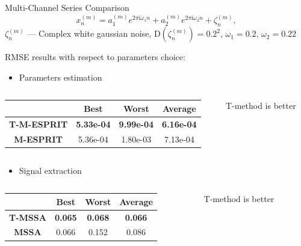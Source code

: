 \documentclass[pdf, unicode, ucs, notheorems]{beamer}
\newcommand{\bluetext}[1]{{\usebeamercolor[fg]{bluetext_color}#1}}
\theoremstyle{definition}
\begin{document}
\begin{frame}{Multi-Channel Series Comparison}
  \[
    x_{n}^{(m)} = a_1^{(m)}
    e^{2 \pi \mathrm{i} \omega_1 n} +
    a_2^{(m)}
    e^{2 \pi \mathrm{i} \omega_2 n} + \zeta_n^{(m)},
  \]
  $\zeta_n^{(m)}$ --- Complex white gaussian noise,
  $\mathrm{D}\left(\zeta_n^{(m)}\right) = 0.2^2$, $\omega_1 = 0.2,\,
  \omega_2 = 0.22$

  \medskip

  \bluetext{RMSE results with respect to parameters choice:}
  \begin{itemize}
    \item Parameters estimation
  \end{itemize}

  \begin{columns}
    \begin{column}{0.8\textwidth}
      \begin{table}[ht]
        \centering
        \begin{tabular}{c|ccc}
          \hline
          & Best & Worst & Average \\
          \hline
          \textbf{T-M-ESPRIT} & \textbf{\bluetext{5.33e-04}} &
          \textbf{\bluetext{9.99e-04}} &
          \textbf{\bluetext{6.16e-04}} \\
          \textbf{M-ESPRIT} & \bluetext{5.36e-04} & 1.80e-03
          & 7.13e-04 \\
          \hline
        \end{tabular}
      \end{table}
    \end{column}
    \begin{column}{0.2\textwidth}
      T-method is better
    \end{column}
  \end{columns}

  \begin{itemize}
    \item Signal extraction
  \end{itemize}

  \begin{columns}
    \begin{column}{0.7\textwidth}
      \begin{table}[ht]
        \centering
        \begin{tabular}{c|ccc}
          \hline
          & Best & Worst & Average \\
          \hline
          \textbf{T-MSSA} & \textbf{\bluetext{0.065}} &
          \textbf{\bluetext{0.068}} &
          \textbf{\bluetext{0.066}} \\
          \textbf{MSSA} & \bluetext{0.066} & 0.152 & 0.086 \\
          \hline
        \end{tabular}
      \end{table}
    \end{column}
    \begin{column}{0.3\textwidth}
      T-method is better
    \end{column}
  \end{columns}
\end{frame}
\end{document}
